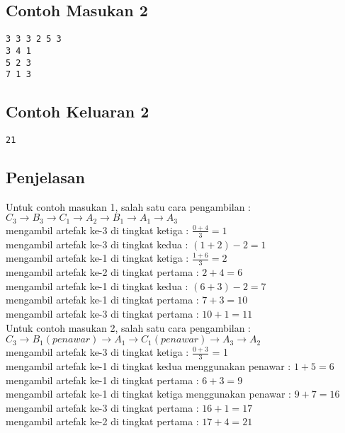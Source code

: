 \documentclass{article}
\begin{document}
\begin{multicols}{2}
\subsection*{Contoh Masukan 2}
\begin{lstlisting}
3 3 3 2 5 3
3 4 1
5 2 3
7 1 3
\end{lstlisting}
\columnbreak
\subsection*{Contoh Keluaran 2}
\begin{lstlisting}
21
\end{lstlisting}
\vfill
\null
\end{multicols}
\subsection*{Penjelasan}

Untuk contoh masukan 1, salah satu cara pengambilan : {$C_3 \rightarrow B_3 \rightarrow C_1 \rightarrow A_2 \rightarrow B_1 \rightarrow A_1 \rightarrow A_3$}\\
mengambil artefak ke-3 di tingkat ketiga : $\frac{0+4}{3} = 1$ \\
mengambil artefak ke-3 di tingkat kedua : $(1+2) - 2 = 1$\\
mengambil artefak ke-1 di tingkat ketiga : $\frac{1+6}{3} = 2$\\
mengambil artefak ke-2 di tingkat pertama : $2 + 4 = 6$\\
mengambil artefak ke-1 di tingkat kedua : $(6+3) - 2 = 7$\\
mengambil artefak ke-1 di tingkat pertama : $7 + 3 = 10$\\
mengambil artefak ke-3 di tingkat pertama : $10 + 1 = 11$\\

Untuk contoh masukan 2, salah satu cara pengambilan : $C_3 \rightarrow B_1 (penawar) \rightarrow A_1 \rightarrow C_1 (penawar) \rightarrow A_3 \rightarrow A_2$\\
mengambil artefak ke-3 di tingkat ketiga : $\frac{0+3}{3}$ = 1\\
mengambil artefak ke-1 di tingkat kedua menggunakan penawar : $1 + 5 = 6$\\
mengambil artefak ke-1 di tingkat pertama : $6 + 3 = 9$\\
mengambil artefak ke-1 di tingkat ketiga menggunakan penawar : $9 + 7 = 16$\\
mengambil artefak ke-3 di tingkat pertama : $16 + 1 = 17$\\
mengambil artefak ke-2 di tingkat pertama : $17 + 4 = 21$\\

\pagebreak
\end{document}

